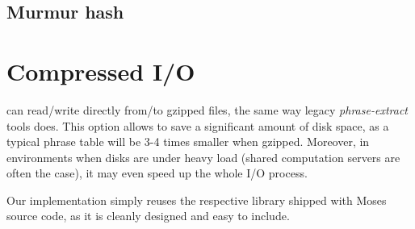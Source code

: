 \subsection{Murmur hash}

\section{Compressed I/O}

\Eppex{} can read/write directly from/to gzipped files, the same way legacy \emph{phrase-extract}
tools does.
This option allows to save a significant amount of disk space, as a typical phrase table will be
3-4 times smaller when gzipped. %
Moreover, in environments when disks are under heavy load (shared computation servers are often
the case), it may even speed up the whole I/O process.

Our implementation simply reuses the respective library shipped with Moses source code,
as it is cleanly designed and easy to include.
